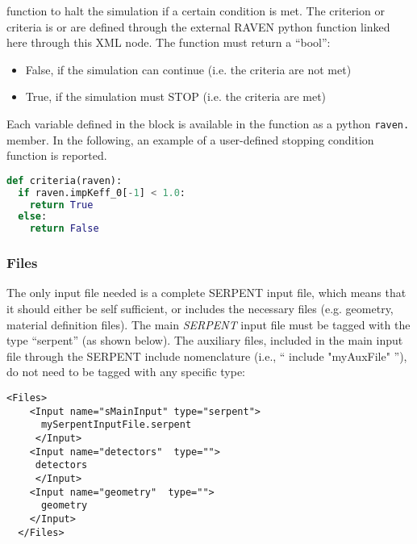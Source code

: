 \begin{itemize}
                                                            function to halt the simulation if a certain condition is
                                                            met. The criterion or criteria is or are defined through the external RAVEN python function linked here through this XML node. 
                                                            The function must return a ``bool'':
                                                            \begin{itemize}
                                                              \item False, if the simulation can continue (i.e. the criteria are not met)
                                                              \item True, if the simulation must STOP (i.e. the criteria are met)
                                                            \end{itemize}
                                                            Each variable defined in the  block is available in the
                                                            function as a python \texttt{raven.} member. In the following, an example of a
                                                            user-defined stopping condition function is reported.
                                                            
\begin{lstlisting}[language=python]
def criteria(raven):
  if raven.impKeff_0[-1] < 1.0:
    return True
  else:
    return False
\end{lstlisting}

\end{itemize}

\subsubsection{Files}
The only input file needed is a complete SERPENT input file,
which means that it should either be self sufficient, or includes
the necessary files (e.g. geometry, material definition files).
The main \textit{SERPENT} input file must be tagged with the
type ``serpent'' (as shown below). The auxiliary files, included in the
main input file through the SERPENT include nomenclature (i.e., `` include "myAuxFile" ''),
do not need to be tagged with any specific type:

\begin{lstlisting}[style=XML]
  <Files>
    <Input name="sMainInput" type="serpent">
      mySerpentInputFile.serpent
     </Input>
    <Input name="detectors"  type="">
     detectors
     </Input>
    <Input name="geometry"  type="">
      geometry
    </Input>
  </Files>
\end{lstlisting}

